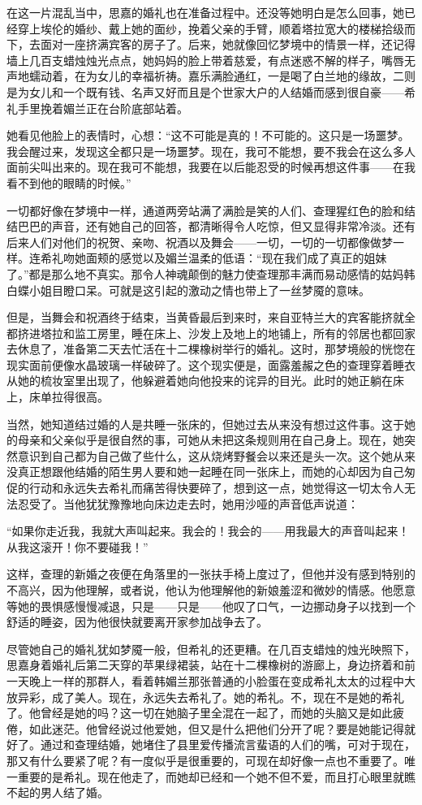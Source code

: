 \par 在这一片混乱当中，思嘉的婚礼也在准备过程中。还没等她明白是怎么回事，她已经穿上埃伦的婚纱、戴上她的面纱，挽着父亲的手臂，顺着塔拉宽大的楼梯拾级而下，去面对一座挤满宾客的房子了。后来，她就像回忆梦境中的情景一样，还记得墙上几百支蜡烛烛光点点，她妈妈的脸上带着慈爱，有点迷惑不解的样子，嘴唇无声地蠕动着，在为女儿的幸福祈祷。嘉乐满脸通红，一是喝了白兰地的缘故，二则是为女儿和一个既有钱、名声又好而且是个世家大户的人结婚而感到很自豪——希礼手里挽着媚兰正在台阶底部站着。
\par 她看见他脸上的表情时，心想：“这不可能是真的！不可能的。这只是一场噩梦。我会醒过来，发现这全都只是一场噩梦。现在，我可不能想，要不我会在这么多人面前尖叫出来的。现在我可不能想，我要在以后能忍受的时候再想这件事——在我看不到他的眼睛的时候。”
\par 一切都好像在梦境中一样，通道两旁站满了满脸是笑的人们、查理猩红色的脸和结结巴巴的声音，还有她自己的回答，都清晰得令人吃惊，但又显得非常冷淡。还有后来人们对他们的祝贺、亲吻、祝酒以及舞会——一切，一切的一切都像做梦一样。连希礼吻她面颊的感觉以及媚兰温柔的低语：“现在我们成了真正的姐妹了。”都是那么地不真实。那令人神魂颠倒的魅力使查理那丰满而易动感情的姑妈韩白蝶小姐目瞪口呆。可就是这引起的激动之情也带上了一丝梦魇的意味。
\par 但是，当舞会和祝酒终于结束，当黄昏最后到来时，来自亚特兰大的宾客能挤就全都挤进塔拉和监工房里，睡在床上、沙发上及地上的地铺上，所有的邻居也都回家去休息了，准备第二天去忙活在十二棵橡树举行的婚礼。这时，那梦境般的恍惚在现实面前便像水晶玻璃一样破碎了。这个现实便是，面露羞赧之色的查理穿着睡衣从她的梳妆室里出现了，他躲避着她向他投来的诧异的目光。此时的她正躺在床上，床单拉得很高。
\par 当然，她知道结过婚的人是共睡一张床的，但她过去从来没有想过这件事。这于她的母亲和父亲似乎是很自然的事，可她从未把这条规则用在自己身上。现在，她突然意识到自己都为自己做了些什么，这从烧烤野餐会以来还是头一次。这个她从来没真正想跟他结婚的陌生男人要和她一起睡在同一张床上，而她的心却因为自己匆促的行动和永远失去希礼而痛苦得快要碎了，想到这一点，她觉得这一切太令人无法忍受了。当他犹犹豫豫地向床边走去时，她用沙哑的声音低声说道：
\par “如果你走近我，我就大声叫起来。我会的！我会的——用我最大的声音叫起来！从我这滚开！你不要碰我！”
\par 这样，查理的新婚之夜便在角落里的一张扶手椅上度过了，但他并没有感到特别的不高兴，因为他理解，或者说，他认为他理解他的新娘羞涩和微妙的情感。他愿意等她的畏惧感慢慢减退，只是——只是——他叹了口气，一边挪动身子以找到一个舒适的睡姿，因为他很快就要离开家参加战争去了。
\par 尽管她自己的婚礼犹如梦魇一般，但希礼的还更糟。在几百支蜡烛的烛光映照下，思嘉身着婚礼后第二天穿的苹果绿裙装，站在十二棵橡树的游廊上，身边挤着和前一天晚上一样的那群人，看着韩媚兰那张普通的小脸蛋在变成希礼太太的过程中大放异彩，成了美人。现在，永远失去希礼了。她的希礼。不，现在不是她的希礼了。他曾经是她的吗？这一切在她脑子里全混在一起了，而她的头脑又是如此疲倦，如此迷茫。他曾经说过他爱她，但又是什么把他们分开了呢？要是她能记得就好了。通过和查理结婚，她堵住了县里爱传播流言蜚语的人们的嘴，可对于现在，那又有什么要紧了呢？有一度似乎是很重要的，可现在却好像一点也不重要了。唯一重要的是希礼。现在他走了，而她却已经和一个她不但不爱，而且打心眼里就瞧不起的男人结了婚。
